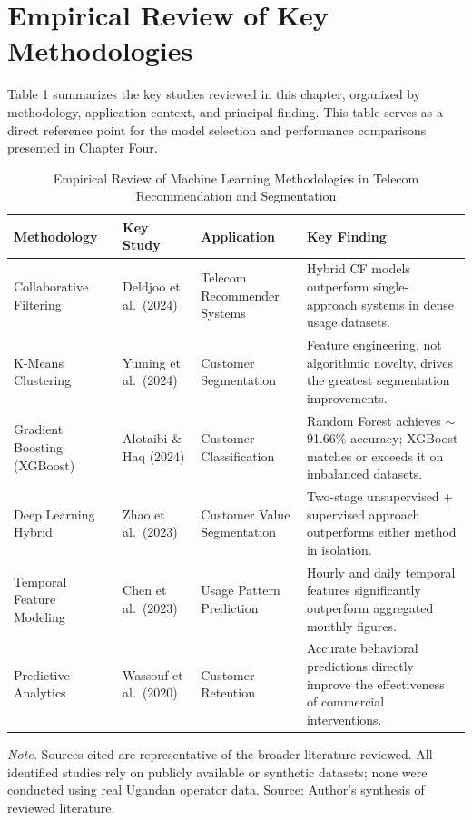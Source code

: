 \section{Empirical Review of Key Methodologies}

Table 1 summarizes the key studies reviewed in this chapter, organized by methodology, application context, and principal finding. This table serves as a direct reference point for the model selection and performance comparisons presented in Chapter Four.

\begin{table}[H]
\centering
\caption{Empirical Review of Machine Learning Methodologies in Telecom Recommendation and Segmentation}
\label{tab:litreview}
\begin{tabular}{p{3cm}p{3cm}p{3cm}p{5cm}}
\toprule
\textbf{Methodology} & \textbf{Key Study} & \textbf{Application} & \textbf{Key Finding} \\
\midrule
Collaborative Filtering & Deldjoo et al.\ (2024) & Telecom Recommender Systems & Hybrid CF models outperform single-approach systems in dense usage datasets. \\
\midrule
K-Means Clustering & Yuming et al.\ (2024) & Customer Segmentation & Feature engineering, not algorithmic novelty, drives the greatest segmentation improvements. \\
\midrule
Gradient Boosting (XGBoost) & Alotaibi \& Haq (2024) & Customer Classification & Random Forest achieves $\sim$91.66\% accuracy; XGBoost matches or exceeds it on imbalanced datasets. \\
\midrule
Deep Learning Hybrid & Zhao et al.\ (2023) & Customer Value Segmentation & Two-stage unsupervised + supervised approach outperforms either method in isolation. \\
\midrule
Temporal Feature Modeling & Chen et al.\ (2023) & Usage Pattern Prediction & Hourly and daily temporal features significantly outperform aggregated monthly figures. \\
\midrule
Predictive Analytics & Wassouf et al.\ (2020) & Customer Retention & Accurate behavioral predictions directly improve the effectiveness of commercial interventions. \\
\bottomrule
\end{tabular}
\begin{flushleft}
\small\textit{Note.} Sources cited are representative of the broader literature reviewed. All identified studies rely on publicly available or synthetic datasets; none were conducted using real Ugandan operator data. Source: Author's synthesis of reviewed literature.
\end{flushleft}
\end{table}

